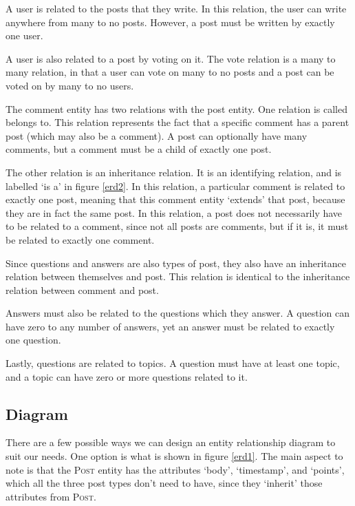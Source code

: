 A user is related to the posts that they write. In this relation, the user can write anywhere from many to no posts. However, a post must be written by exactly one user.

A user is also related to a post by voting on it. The vote relation is a many to many relation, in that a user can vote on many to no posts and a post can be voted on by many to no users.

The comment entity has two relations with the post entity. One relation is called belongs to. This relation represents the fact that a specific comment has a parent post (which may also be a comment). A post can optionally have many comments, but a comment must be a child of exactly one post.

The other relation is an inheritance relation. It is an identifying relation, and is labelled `is a' in figure \ref{erd2}. In this relation, a particular comment is related to exactly one post, meaning that this comment entity `extends' that post, because they are in fact the same post. In this relation, a post does not necessarily have to be related to a comment, since not all posts are comments, but if it is, it must be related to exactly one comment.

Since questions and answers are also types of post, they also have an inheritance relation between themselves and post. This relation is identical to the inheritance relation between comment and post.

Answers must also be related to the questions which they answer. A question can have zero to any number of answers, yet an answer must be related to exactly one question.

Lastly, questions are related to topics. A question must have at least one topic, and a topic can have zero or more questions related to it.

\subsection{Diagram}

There are a few possible ways we can design an entity relationship diagram to suit our needs. One option is what is shown in figure \ref{erd1}. The main aspect to note is that the \textsc{Post} entity has the attributes `body', `timestamp', and `points', which all the three post types don't need to have, since they `inherit' those attributes from \textsc{Post}.

